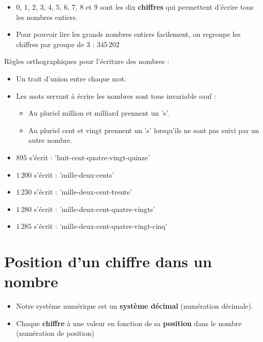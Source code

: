 \begin{pageCours}
\begin{Rqs}
\begin{itemize}
\item $0$, $1$, $2$, $3$, $4$, $5$, $6$, $7$, $8$ et $9$ sont les dix \textbf{chiffres} qui permettent d'écrire tous les nombres entiers.
\item Pour pouvoir lire les grands nombres entiers facilement, on regroupe les chiffres par groupe de 3 : $345\,202$
\end{itemize}
\end{Rqs}

\begin{Reg}
Règles orthographiques pour l'écriture des nombres :
\begin{itemize}
    \item Un trait d'union entre chaque mot.
    \item Les mots servant à écrire les nombres sont tous invariable sauf :
    \begin{itemize}
        \item Au pluriel million et milliard prennent un 's'.
        \item Au pluriel cent et vingt prennent un 's' lorsqu'ils ne sont pas suivi par un autre nombre.
    \end{itemize}
\end{itemize}
\end{Reg}

\begin{Ex}
\begin{itemize}
\item $895$ s'écrit : 'huit-cent-quatre-vingt-quinze'
\item $1\,200$ s'écrit : 'mille-deux-cents'
\item $1\,230$ s'écrit : 'mille-deux-cent-trente'
\item $1\,280$ s'écrit : 'mille-deux-cent-quatre-vingts'
\item $1\,285$ s'écrit : 'mille-deux-cent-quatre-vingt-cinq'
\end{itemize}
\end{Ex}

\section{Position d'un chiffre dans un nombre}

\begin{Def}
\begin{itemize}
\item Notre système numérique est un \textbf{système décimal} (numération décimale).
\item Chaque \textbf{chiffre} à une valeur en fonction de sa \textbf{position} dans le nombre (numération de position)
\end{itemize}
\end{Def}


\end{pageCours}
